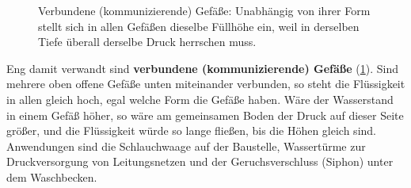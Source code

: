\begin{figure}[htb]
    \centering
    \caption{Verbundene (kommunizierende) Gefäße: Unabhängig von ihrer Form stellt sich in allen Gefäßen dieselbe Füllhöhe ein, weil in derselben Tiefe überall derselbe Druck herrschen muss.}\label{fig: verbundene_gefaesse}
\end{figure}

Eng damit verwandt sind \textbf{verbundene (kommunizierende) Gefäße} (\cref{fig: verbundene_gefaesse}). Sind mehrere oben offene Gefäße unten miteinander verbunden, so steht die Flüssigkeit in allen gleich hoch, egal welche Form die Gefäße haben. Wäre der Wasserstand in einem Gefäß höher, so wäre am gemeinsamen Boden der Druck auf dieser Seite größer, und die Flüssigkeit würde so lange fließen, bis die Höhen gleich sind. Anwendungen sind die Schlauchwaage auf der Baustelle, Wassertürme zur Druckversorgung von Leitungsnetzen und der Geruchsverschluss (Siphon) unter dem Waschbecken.

